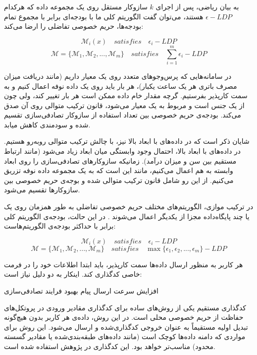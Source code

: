 به بیان ریاضی، پس از اجرای $k$ سازوکار مستقل روی یک مجموعه داده که هرکدام $\epsilon{-}LDP$ هستند، می‌توان گفت الگوریتم کلی ما با بودجه‌ای برابر با مجموع تمام بودجه‌ها، حریم خصوصی تفاضلی را ارضا می‌کند:

$$\mathcal{M}_i(x) \quad satisfies \quad \epsilon_i{-}LDP$$
$$\mathcal{M} = \{ \mathcal{M}_1 , \mathcal{M}_2 , ... , \mathcal{M}_m \} \quad satisfies \quad \sum_{i=1}^{m} \epsilon_i{-}LDP$$

در سامانه‌هایی که پرس‌و‌جو‌های متعدد روی یک معیار داریم (مانند دریافت میزان مصرف باتری هر یک ساعت یکبار)، هر بار باید روی یک داده نوفه اعمال کنیم و به سمت کارپذیر بفرستیم. گرچه مقدار خام داده ممکن است هر بار تغییر کند، ولی چون از یک جنس است و مربوط به یک معیار می‌شود، قانون ترکیب متوالی روی آن صدق می‌کند. بودجه‌ی حریم خصوصی بین تعداد استفاده از سازوکار تصادفی‌سازی تقسیم شده و سودمندی کاهش میابد.

شایان ذکر است که در داده‌های با ابعاد بالا نیز، با چالش ترکیب متوالی روبه‌رو هستیم. در داده‌های با ابعاد بالا، احتمال وجود وابستگی میان ابعاد زیاد می‌شود (مانند ارتباط مستقیم بین سن و میزان درآمد). زمانیکه سازوکارهای تصادفی‌سازی را روی ابعاد وابسته به هم اعمال می‌کنیم، مانند این است که به یک مجموعه داده نوفه تزریق می‌کنیم. از این رو شامل قانون ترکیب متوالی شده و بوجه‌ی حریم خصوصی بین سازوکارها تقسیم می‌شود.


در ترکیب موازی، الگوریتم‌های مختلف حریم خصوصی تفاضلی به طور همزمان روی یک یا چند پایگاه‌داده مجزا  از یکدیگر اعمال می‌شوند . در این حالت، بودجه‌ی الگوریتم کلی برابر با حداکثر بودجه‌ی الگوریتم‌هاست:

$$\mathcal{M}_i(x) \quad satisfies \quad \epsilon_i{-}LDP$$
$$ \mathcal{M} = \{ \mathcal{M}_1 , \mathcal{M}_2 , ... , \mathcal{M}_m \} \quad satisfies \quad \max \{ \epsilon_1 , \epsilon_2 , ... , \epsilon_m \}{-}LDP$$


هر کاربر به منظور ارسال داده‌ها سمت کارپذیر، باید ابتدا اطلاعات خود را در فرمت خاصی کدگذاری کند. اینکار به دو دلیل نیاز است:

 افزایش سرعت ارسال پیام
 بهبود فرایند تصادفی‌سازی


کدگذاری مستقیم یکی از روش‌های ساده برای کدگذاری مقادیر ورودی در پروتکل‌های حفاظت از حریم خصوصی محلی است. در این روش، داده‌ی هر کاربر بدون هیچ‌گونه تبدیل اولیه مستقیماً به عنوان خروجی کدگذاری‌شده و ارسال می‌شود. این روش برای مواردی که دامنه داده‌ها کوچک است (مانند داده‌های طبقه‌بندی‌شده یا مقادیر گسسته محدود) مناسب‌تر خواهد بود. این کدگذاری در پژوهش  استفاده شده است.

